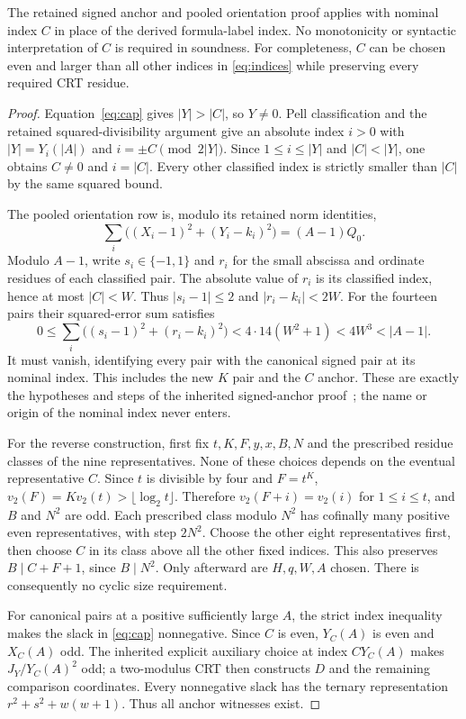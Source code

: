 \begin{proposition}\label{prop:anchor}
The retained signed anchor and pooled orientation proof applies with
nominal index $C$ in place of the derived formula-label index. No
monotonicity or syntactic interpretation of $C$ is required in soundness.
For completeness, $C$ can be chosen even and larger than all other indices
in \eqref{eq:indices} while preserving every required CRT residue.
\end{proposition}
\begin{proof}
Equation~\eqref{eq:cap} gives $|Y|>|C|$, so $Y\ne0$. Pell
classification and the retained squared-divisibility argument give an
absolute index $i>0$ with $|Y|=Y_i(|A|)$ and
$i=\pm C\pmod{2|Y|}$. Since $1\le i\le|Y|$ and $|C|<|Y|$,
one obtains $C\ne0$ and $i=|C|$. Every other classified index is
strictly smaller than $|C|$ by the same squared bound.

The pooled orientation row is, modulo its retained norm identities,
\[
 \sum_i\bigl((X_i-1)^2+(Y_i-k_i)^2\bigr)=(A-1)Q_0.
\]
Modulo $A-1$, write $s_i\in\{-1,1\}$ and $r_i$ for the small
abscissa and ordinate residues of each classified pair. The absolute
value of $r_i$ is its classified index, hence at most $|C|<W$.
Thus $|s_i-1|\le2$ and $|r_i-k_i|<2W$. For the fourteen pairs their
squared-error sum satisfies
\[
 0\le\sum_i\bigl((s_i-1)^2+(r_i-k_i)^2\bigr)
       <4\cdot14(W^2+1)<4W^3<|A-1|.
\]
It must vanish, identifying every pair with the canonical signed pair
at its nominal index. This includes the new $K$ pair and the $C$ anchor.
These are exactly the hypotheses and steps of the inherited signed-anchor
proof~\cite{anchor}; the name or origin of the nominal index never enters.

For the reverse construction, first fix $t,K,F,y,x,B,N$ and the
prescribed residue classes of the nine representatives. None of these
choices depends on the eventual representative $C$. Since $t$ is
divisible by four and $F=t^K$, $v_2(F)=K v_2(t)>\lfloor\log_2t\rfloor$.
Therefore $v_2(F+i)=v_2(i)$ for $1\le i\le t$, and $B$ and $N^2$
are odd. Each prescribed class modulo $N^2$ has cofinally many positive
even representatives, with step $2N^2$. Choose the other eight representatives
first, then choose $C$ in its class above all the other fixed indices.
This also preserves $B\mid C+F+1$, since $B\mid N^2$.
Only afterward are $H,q,W,A$ chosen. There is consequently no cyclic
size requirement.

For canonical pairs at a positive sufficiently large $A$, the strict index
inequality makes the slack in \eqref{eq:cap} nonnegative. Since $C$ is
even, $Y_C(A)$ is even and $X_C(A)$ odd. The inherited explicit auxiliary
choice at index $C Y_C(A)$ makes $J_Y/Y_C(A)^2$ odd; a two-modulus CRT
then constructs $D$ and the remaining comparison coordinates. Every
nonnegative slack has the ternary representation
$r^2+s^2+w(w+1)$. Thus all anchor witnesses exist.
\end{proof}

